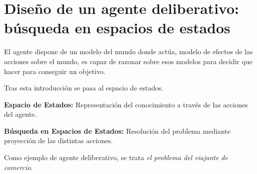 \section{Diseño de un agente deliberativo: búsqueda en espacios de estados}

El agente dispone de un modelo del mundo donde actúa, modelo de efectos de las acciones sobre el mundo, es capaz de razonar sobre esos modelos para decidir que hacer para conseguir un objetivo.


Tras esta introducción se pasa al espacio de estados.

\textbf{Espacio de Estados: } Representación del
conocimiento a través de las acciones del
agente.

\textbf{Búsqueda en Espacios de Estados: } Resolución del problema mediante proyección
de las distintas acciones.

Como ejemplo de agente deliberativo, se trata \textit{el problema del viajante de comercio}.